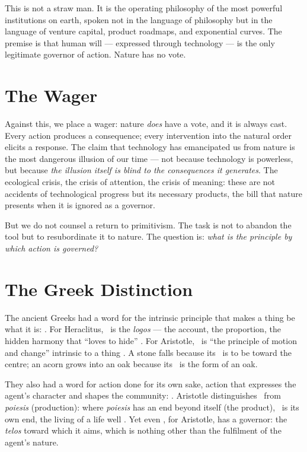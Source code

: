 This is not a straw man. It is the operating philosophy of the most powerful
institutions on earth, spoken not in the language of philosophy but in the
language of venture capital, product roadmaps, and exponential curves. The
premise is that human will --- expressed through technology --- is the only
legitimate governor of action. Nature has no vote.

\section{The Wager}

Against this, we place a wager: nature \emph{does} have a vote, and it is
always cast. Every action produces a consequence; every intervention into the
natural order elicits a response. The claim that technology has emancipated us
from nature is the most dangerous illusion of our time --- not because technology
is powerless, but because \emph{the illusion itself is blind to the consequences
it generates}. The ecological crisis, the crisis of attention, the crisis of
meaning: these are not accidents of technological progress but its necessary
products, the bill that nature presents when it is ignored as a governor.

But we do not counsel a return to primitivism. The task is not to abandon the
tool but to resubordinate it to nature. The question is: \emph{what is the
principle by which action is governed?}

\section{The Greek Distinction}

The ancient Greeks had a word for the intrinsic principle that makes a thing be
what it is: \physis. For Heraclitus, \physis\ is the \emph{logos} --- the
account, the proportion, the hidden harmony that ``loves to hide''
\parencite{kirk1983presocratic}. For
Aristotle, \physis\ is ``the principle of motion and change'' intrinsic to a
thing \parencite[II.1]{aristotle1984physics}. A stone falls because its \physis\ is to be
toward the centre; an acorn grows into an oak because its \physis\ is the form
of an oak.

They also had a word for action done for its own sake, action that expresses
the agent's character and shapes the community: \praxis. Aristotle
 distinguishes \praxis\ from \emph{poiesis} (production): where \emph{poiesis}
has an end beyond itself (the product), \praxis\ is its own end, the living of
a life well \parencite[VI.4]{aristotle2000ethics}. Yet even \praxis, for Aristotle, has a governor: the
\emph{telos} toward which it aims, which is nothing other than the fulfilment
of the agent's nature.

